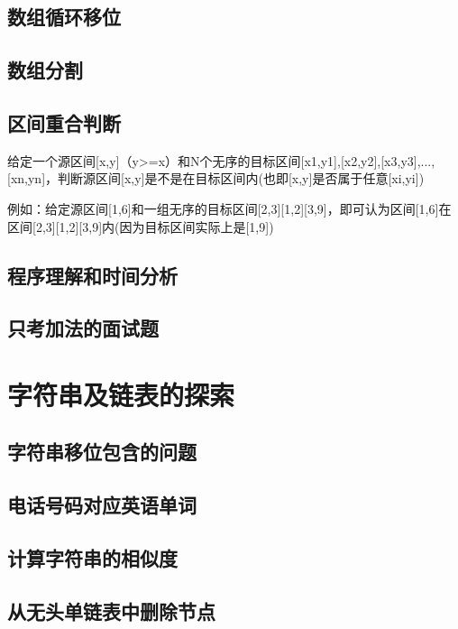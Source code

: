 \documentclass[UTF8,a4paper,12pt]{ctexbook}
\begin{document}
		\subsection{数组循环移位}
		
		\subsection{数组分割}
		
		\subsection{区间重合判断}
			给定一个源区间[x,y]（y>=x）和N个无序的目标区间[x1,y1],[x2,y2],[x3,y3],...,[xn,yn]，判断源区间[x,y]是不是在目标区间内(也即[x,y]是否属于任意[xi,yi]) 
			
			例如：给定源区间[1,6]和一组无序的目标区间[2,3][1,2][3,9]，即可认为区间[1,6]在区间[2,3][1,2][3,9]内(因为目标区间实际上是[1,9]) 
			
		\subsection{程序理解和时间分析 }
		
		\subsection{只考加法的面试题 }
	
	\section{字符串及链表的探索}
		\subsection{字符串移位包含的问题}
		
		\subsection{电话号码对应英语单词}
		
		\subsection{计算字符串的相似度}
		
		\subsection{从无头单链表中删除节点}
		
\end{document}
